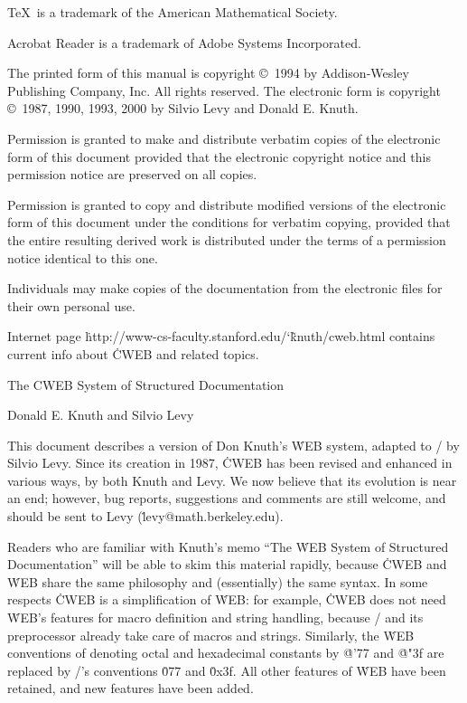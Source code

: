 \noindent
\TeX\ is a trademark of the American Mathematical Society.

\noindent
Acrobat Reader is a trademark of Adobe Systems Incorporated.

\bigskip\noindent
The printed form of this manual is copyright \copyright\ 1994
  by Addison-Wesley Publishing Company, Inc.  All rights reserved.
\smallskip\noindent
The electronic form is copyright \copyright\ 1987, 1990, 1993, 2000
  by Silvio Levy and Donald E. Knuth.

\bigskip\noindent
Permission is granted to make and distribute verbatim copies of the
electronic form of this document provided that the electronic copyright
notice and this permission notice are preserved on all copies.

\smallskip\noindent
Permission is granted to copy and distribute modified versions of the
electronic form of this document under the conditions for verbatim copying,
provided that the entire resulting derived work is distributed under the terms
of a permission notice identical to this one.

\smallskip\noindent
Individuals may make copies of the documentation from the electronic files
for their own personal use.

\smallskip\noindent
Internet page \.{http://www-cs-faculty.stanford.edu/\char`\~knuth/cweb.html}
contains current info about \.{CWEB} and related topics.

 \titletrue\eject

\titletrue
\centerline{\titlefont The {\ttitlefont CWEB} System of
    Structured Documentation}

\centerline{\authorfont Donald E. Knuth and Silvio Levy}

\noindent
This document describes a version of Don Knuth's \.{WEB} system,
adapted to \CEE/ by Silvio Levy.  Since its creation in 1987, \.{CWEB}
has been revised and enhanced in various ways, by both Knuth and Levy.
We now believe that its evolution is near an end; however, bug
reports, suggestions and comments are still welcome, and
should be sent to Levy (\.{levy@math.berkeley.edu}).

Readers who are familiar with Knuth's memo ``The \.{WEB} System of Structured
Documentation'' will be able
to skim this material rapidly, because \.{CWEB} and \.{WEB} share
the same philosophy and (essentially) the same syntax.  In some respects
\.{CWEB} is a simplification
of \.{WEB}: for example, \.{CWEB} does not need \.{WEB}'s features
for macro definition and string handling, because \CEE/ and its
preprocessor already take care of macros and strings. Similarly, the \.{WEB}
conventions of denoting octal and hexadecimal constants by \.{@'77}
and \.{@"3f} are replaced by \CEE/'s conventions \.{077} and
\.{0x3f}. All other features of \.{WEB} have been
retained, and new features have been added.

